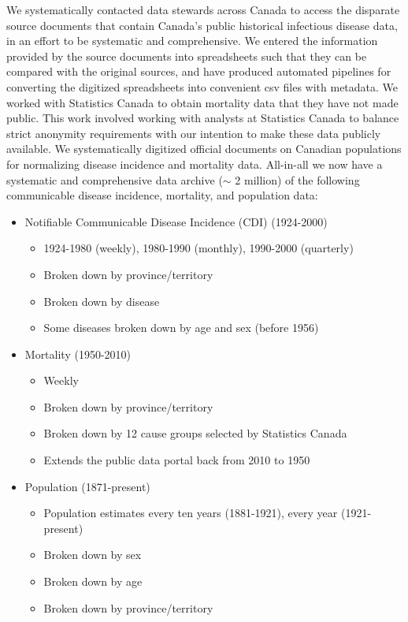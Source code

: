 We systematically contacted data stewards across Canada to access the disparate source documents that contain Canada's public historical infectious disease data, in an effort to be systematic and comprehensive. We entered the information provided by the source documents into spreadsheets such that they can be compared with the original sources, and have produced automated pipelines for converting the digitized spreadsheets into convenient csv files with metadata. We worked with Statistics Canada to obtain mortality data that they have not made public. This work involved working with analysts at Statistics Canada to balance strict anonymity requirements with our intention to make these data publicly available. We systematically digitized official documents on Canadian populations for normalizing disease incidence and mortality data. All-in-all we now have a systematic and comprehensive data archive ($\sim$ 2 million) of the following communicable disease incidence, mortality, and population data:
\begin{itemize}
  \item Notifiable Communicable Disease Incidence (CDI) (1924-2000)
    \begin{itemize}
      \item 1924-1980 (weekly), 1980-1990 (monthly), 1990-2000 (quarterly)
      \item Broken down by province/territory
      \item Broken down by disease
      \item Some diseases broken down by age and sex (before 1956)
    \end{itemize}
  \item Mortality (1950-2010)
    \begin{itemize}
      \item Weekly
      \item Broken down by province/territory
      \item Broken down by 12 cause groups selected by Statistics Canada
      \item Extends the public data portal back from 2010 to 1950
    \end{itemize}
  \item Population (1871-present)
    \begin{itemize}
      \item Population estimates every ten years (1881-1921), every year (1921-present)
      \item Broken down by sex
      \item Broken down by age
      \item Broken down by province/territory
    \end{itemize}
\end{itemize}

